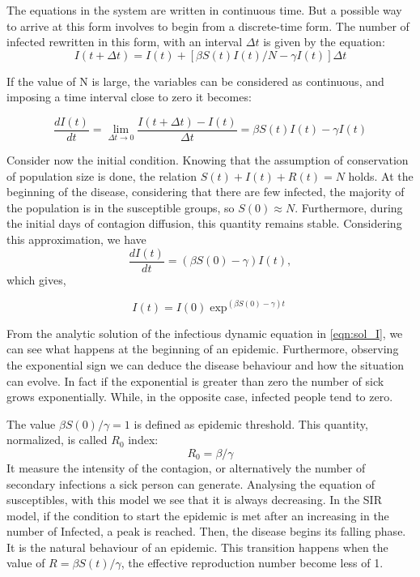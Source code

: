The equations in the system are written in continuous time. But a possible way to arrive at this form involves to begin from a discrete-time form. The number of infected rewritten in this form, with an interval  $\Delta t$ is given by the equation:
\begin{equation}
	I(t+\Delta t) = I(t) + [\beta S(t)I(t)/N - \gamma I(t)]\Delta t
\end{equation}

If the value of N is large, the variables can be considered as continuous, and imposing a time interval close to zero it becomes:

\begin{equation}
	\frac{d I(t)}{dt} = \lim_{\Delta t \rightarrow  0} \frac{I(t+\Delta t)-I(t)}{\Delta t} = \beta S(t) I(t)- \gamma I(t)
\end{equation}

Consider now the initial condition. Knowing that the assumption of conservation of population size is done, the relation $S(t)+I(t)+R(t) = N$ holds. At the beginning of the disease, considering that there are few infected, the majority of the population is in the susceptible groups, so $S(0) \approx N$. Furthermore, during the initial days of contagion diffusion, this quantity remains stable. Considering this approximation, we have 
\begin{equation}
	\frac{d I(t)}{dt} = (\beta S(0)-\gamma)I(t),
\end{equation} 
which gives,

\begin{equation}
	I(t) = I(0) \exp ^{(\beta S(0)- \gamma)t}
	\label{eqn:sol_I}
\end{equation}



From the analytic solution  of the infectious dynamic equation in \ref{eqn:sol_I}, we can see what happens at the beginning of an epidemic. Furthermore, observing the exponential sign we can deduce the disease behaviour and how the situation can evolve.
In fact if the exponential is greater than zero the number of sick grows exponentially. While, in the opposite case, infected people tend to zero. 

The value $ \beta S(0)/\gamma = 1$ is defined as epidemic threshold. This quantity, normalized, is called $R_0$ index:
\begin{equation}
	R_0 = \beta/\gamma
	\label{eqn:basic_rep_number}
\end{equation}
It measure the intensity of the contagion, or alternatively the number of secondary infections a sick person can generate. Analysing the equation of susceptibles, with this model we see that it is always decreasing. In the SIR model, if the condition to start the epidemic is met after an increasing in the number of Infected, a peak is reached. Then, the disease begins its falling phase. It is the natural behaviour of an epidemic.
This transition happens when the value of $R = \beta S(t)/\gamma$, the effective reproduction number become less of 1.


